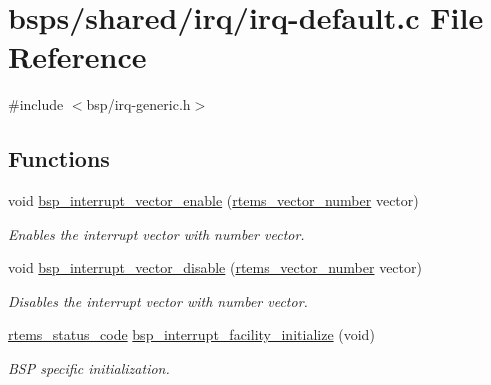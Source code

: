 \hypertarget{irq-default_8c}{}\section{bsps/shared/irq/irq-\/default.c File Reference}
\label{irq-default_8c}
{\ttfamily \#include $<$bsp/irq-\/generic.\+h$>$}\newline
\subsection*{Functions}
\begin{DoxyCompactItemize}
\item 
void \mbox{\hyperlink{group__bsp__interrupt_ga9968f1703b04b05f4f7e9fc5220da39a}{bsp\+\_\+interrupt\+\_\+vector\+\_\+enable}} (\mbox{\hyperlink{group__ClassicINTR_ga3e434c197d99f128e78cae4d9358bd8b}{rtems\+\_\+vector\+\_\+number}} vector)
\begin{DoxyCompactList}\small\item\em Enables the interrupt vector with number {\itshape vector}. \end{DoxyCompactList}\item 
void \mbox{\hyperlink{group__bsp__interrupt_ga5428b914d0cb037e9b3f7cb2b758cabd}{bsp\+\_\+interrupt\+\_\+vector\+\_\+disable}} (\mbox{\hyperlink{group__ClassicINTR_ga3e434c197d99f128e78cae4d9358bd8b}{rtems\+\_\+vector\+\_\+number}} vector)
\begin{DoxyCompactList}\small\item\em Disables the interrupt vector with number {\itshape vector}. \end{DoxyCompactList}\item 
\mbox{\hyperlink{group__ClassicStatus_ga545d41846817eaba6143d52ee4d9e9fe}{rtems\+\_\+status\+\_\+code}} \mbox{\hyperlink{group__bsp__interrupt_gab114a6e92b17b99bf52cf24d1125a9df}{bsp\+\_\+interrupt\+\_\+facility\+\_\+initialize}} (void)
\begin{DoxyCompactList}\small\item\em B\+SP specific initialization. \end{DoxyCompactList}\end{DoxyCompactItemize}
